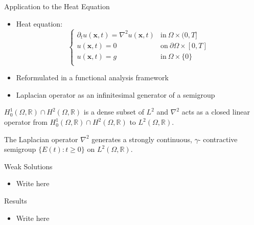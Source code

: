 \documentclass{beamer}
\begin{document}
\begin{frame}{Application to the Heat Equation}
    \begin{itemize}[<+-| alert@+>]
        \item Heat equation: 
        \[
            \begin{cases}
        \partial_t u(\mathbf{x}, t) = \nabla^2 u(\mathbf{x}, t) &\text{in}\ \Omega \times (0, T] \\
        u(\mathbf{x}, t) = 0 &\text{on}\ \partial\Omega \times [0, T] \\
        u(\mathbf{x}, t) = g &\text{in}\ \Omega \times \{0\} \\
    \end{cases}
        \]
        \item Reformulated in a functional analysis framework
        \item Laplacian operator as an infinitesimal generator of a semigroup
    \end{itemize}
\end{frame}

\begin{frame}{}
     \begin{lemma}
         \(H^1_0(\Omega, \mathbb{R}) \cap H^2(\Omega, \mathbb{R})\) is a dense subset of \(L^2\) and \(\nabla^2\)  acts as a closed linear operator from \(H^1_0(\Omega, \mathbb{R}) \cap H^2(\Omega, \mathbb{R})\) to \(L^2(\Omega, \mathbb{R})\).
     \end{lemma}
\end{frame}


\begin{frame}{}
        \begin{theorem}
    The Laplacian operator \(\nabla^2\) generates a strongly continuous, \(\gamma\)- contractive semigroup \(\{E(t) : t \geq 0\}\) on \(L^2(\Omega, \mathbb{R})\).
\end{theorem}
    \end{frame}

\begin{frame}{Weak Solutions}
    \begin{itemize}[<+-| alert@+>]
        \item Write here
    \end{itemize}
\end{frame}

\begin{frame}{Results}
    \begin{itemize}[<+-| alert@+>]
        \item Write here 
    \end{itemize}
\end{frame}
\end{document}
